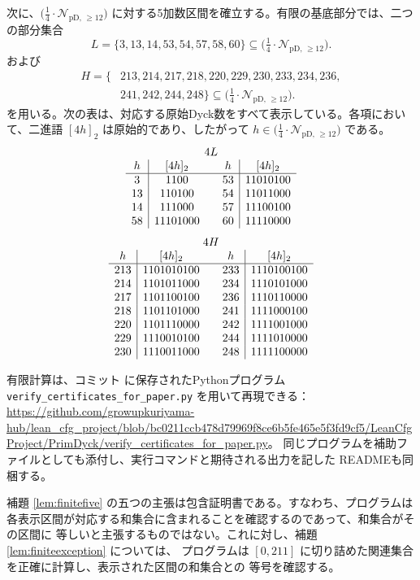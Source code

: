 \documentclass[12pt]{ltjsarticle}
\theoremstyle{plain}
\newcommand{\Pset}{\bigl(\tfrac14\cdot
  \mathcal{N}_{\mathrm{pD},\,\geq12}\bigr)}
\begin{document}
次に、$\Pset$ に対する5加数区間を確立する。有限の基底部分では、二つの部分集合
\begin{equation}\label{eq:L-def}
 L=\{3,13,14,53,54,57,58,60\}\subseteq\Pset.
\end{equation}
および
\begin{equation}\label{eq:H-def}
\begin{split}
 H=\{&213,214,217,218,220,229,230,233,234,236,\\
     &241,242,244,248\}\subseteq\Pset.
\end{split}
\end{equation}
を用いる。次の表は、対応する原始Dyck数をすべて表示している。各項において、二進語
$[4h]_2$ は原始的であり、したがって $h\in\Pset$ である。
\[
\begin{array}{c|c@{\qquad}c|c}
\multicolumn{4}{c}{4L}\\
h&[4h]_2&h&[4h]_2\\ \hline
3&1100&53&11010100\\
13&110100&54&11011000\\
14&111000&57&11100100\\
58&11101000&60&11110000
\end{array}
\]
\[
\begin{array}{c|c@{\qquad}c|c}
\multicolumn{4}{c}{4H}\\
h&[4h]_2&h&[4h]_2\\ \hline
213&1101010100&233&1110100100\\
214&1101011000&234&1110101000\\
217&1101100100&236&1110110000\\
218&1101101000&241&1111000100\\
220&1101110000&242&1111001000\\
229&1110010100&244&1111010000\\
230&1110011000&248&1111100000
\end{array}
\]

有限計算は、コミット
に保存されたPythonプログラム
\texttt{verify\_certificates\_for\_paper.py} を用いて再現できる：
\url{https://github.com/growupkuriyama-hub/lean_cfg_project/blob/bc0211ccb478d79969f8ce6b5fe465e5f3fd9cf5/LeanCfgProject/PrimDyck/verify_certificates_for_paper.py}。
同じプログラムを補助ファイルとしても添付し、実行コマンドと期待される出力を記した
READMEも同梱する。

補題 \ref{lem:finitefive} の五つの主張は包含証明書である。すなわち、プログラムは
各表示区間が対応する和集合に含まれることを確認するのであって、和集合がその区間に
等しいと主張するものではない。これに対し、補題 \ref{lem:finiteexception} については、
プログラムは $[0,211]$ に切り詰めた関連集合を正確に計算し、表示された区間の和集合との
等号を確認する。
\end{document}
